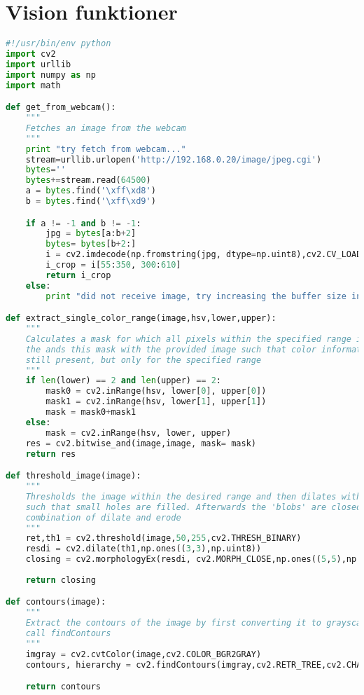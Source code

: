 \section{Vision funktioner}\label{sec:VisionFuntioner}
\begin{lstlisting}[language=Python]
#!/usr/bin/env python
import cv2
import urllib
import numpy as np
import math

def get_from_webcam():
    """
    Fetches an image from the webcam
    """
    print "try fetch from webcam..."
    stream=urllib.urlopen('http://192.168.0.20/image/jpeg.cgi')
    bytes=''
    bytes+=stream.read(64500)
    a = bytes.find('\xff\xd8')
    b = bytes.find('\xff\xd9')

    if a != -1 and b != -1:
        jpg = bytes[a:b+2]
        bytes= bytes[b+2:]
        i = cv2.imdecode(np.fromstring(jpg, dtype=np.uint8),cv2.CV_LOAD_IMAGE_COLOR)
        i_crop = i[55:350, 300:610]
        return i_crop
    else:
        print "did not receive image, try increasing the buffer size in line 13:"

def extract_single_color_range(image,hsv,lower,upper):
    """
    Calculates a mask for which all pixels within the specified range is set to 1
    the ands this mask with the provided image such that color information is
    still present, but only for the specified range
    """
    if len(lower) == 2 and len(upper) == 2:
        mask0 = cv2.inRange(hsv, lower[0], upper[0])
        mask1 = cv2.inRange(hsv, lower[1], upper[1])
        mask = mask0+mask1
    else:
        mask = cv2.inRange(hsv, lower, upper)
    res = cv2.bitwise_and(image,image, mask= mask)
    return res

def threshold_image(image):
    """
    Thresholds the image within the desired range and then dilates with a 3x3 matrix
    such that small holes are filled. Afterwards the 'blobs' are closed using a
    combination of dilate and erode
    """
    ret,th1 = cv2.threshold(image,50,255,cv2.THRESH_BINARY)
    resdi = cv2.dilate(th1,np.ones((3,3),np.uint8))
    closing = cv2.morphologyEx(resdi, cv2.MORPH_CLOSE,np.ones((5,5),np.uint8))
    
    return closing

def contours(image):
    """
    Extract the contours of the image by first converting it to grayscale and then
    call findContours
    """
    imgray = cv2.cvtColor(image,cv2.COLOR_BGR2GRAY)
    contours, hierarchy = cv2.findContours(imgray,cv2.RETR_TREE,cv2.CHAIN_APPROX_SIMPLE)

    return contours


\end{lstlisting}
